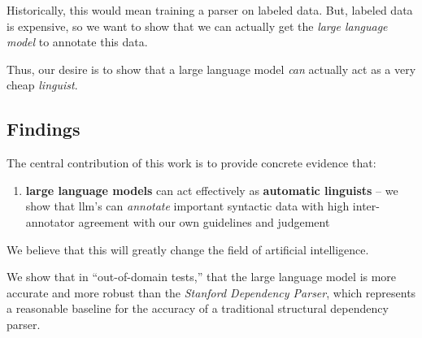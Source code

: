 Historically, this would mean training a parser on labeled data.
But, labeled data is expensive, so we want to show that we can actually get the {\em large language model} to annotate this data.

Thus, our desire is to show that a large language model {\em can} actually act as a very cheap {\em linguist}.
\subsection{Findings}
The central contribution of this work is to provide concrete evidence that:
\begin{enumerate}
    \item {\bf large language models} can act effectively as {\bf automatic linguists} -- we show that llm's can {\em annotate} important syntactic data with high inter-annotator agreement with our own guidelines and judgement
\end{enumerate}
We believe that this will greatly change the field of artificial intelligence.

We show that in ``out-of-domain tests,'' that the large language model is more accurate and more robust than the {\em Stanford Dependency Parser}, which represents a reasonable baseline for the accuracy of a traditional structural dependency parser.

